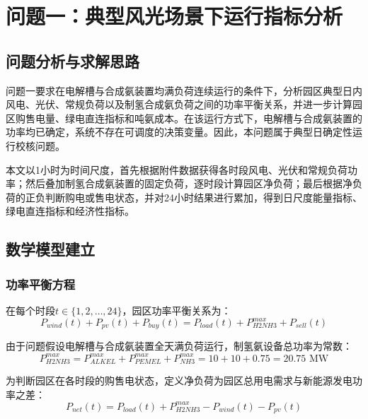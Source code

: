 \section{问题一：典型风光场景下运行指标分析}

\subsection{问题分析与求解思路}

问题一要求在电解槽与合成氨装置均满负荷连续运行的条件下，分析园区典型日内风电、光伏、常规负荷以及制氢合成氨负荷之间的功率平衡关系，并进一步计算园区购售电量、绿电直连指标和吨氨成本。在该运行方式下，电解槽与合成氨装置的功率均已确定，系统不存在可调度的决策变量。因此，本问题属于典型日确定性运行校核问题。

本文以1小时为时间尺度，首先根据附件数据获得各时段风电、光伏和常规负荷功率；然后叠加制氢合成氨装置的固定负荷，逐时段计算园区净负荷；最后根据净负荷的正负判断购电或售电状态，并对24小时结果进行累加，得到日尺度能量指标、绿电直连指标和经济性指标。


\subsection{数学模型建立}

\subsubsection{功率平衡方程}

在每个时段$t \in \{1, 2, \ldots, 24\}$，园区功率平衡关系为：
\begin{equation}\label{eq:power_balance_q1}
P_{wind}(t) + P_{pv}(t) + P_{buy}(t) = P_{load}(t) + P_{H2NH3}^{max} + P_{sell}(t)
\end{equation}

由于问题假设电解槽与合成氨装置全天满负荷运行，制氢氨设备总功率为常数：
\begin{equation}
P_{H2NH3}^{max} = P_{ALKEL}^{max} + P_{PEMEL}^{max} + P_{NH3}^{max} = 10 + 10 + 0.75 = 20.75 \text{ MW}
\end{equation}

为判断园区在各时段的购售电状态，定义净负荷为园区总用电需求与新能源发电功率之差：
\begin{equation}
P_{net}(t) = P_{load}(t) + P_{H2NH3}^{max} - P_{wind}(t) - P_{pv}(t)
\end{equation}

